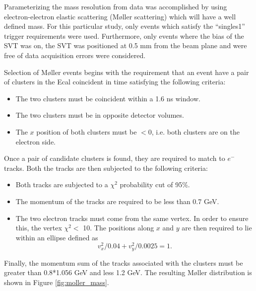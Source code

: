 Parameterizing the mass resolution from data was accomplished by using electron-electron
elastic scattering (M\o ller scattering) which will have a well defined mass.
For this particular study, only events which satisfy the ``singles1'' trigger 
requirements were used.  Furthermore, only events where the bias of the SVT was 
on, the SVT was positioned at 0.5 mm from the beam plane and were free of 
data acquisition errors were considered.

Selection of M\o ller events begins with the requirement that an event have a
pair of clusters in the Ecal coincident in time satisfying the following criteria:
\begin{itemize}
    \item The two clusters must be coincident within a 1.6 ns window.
    \item The two clusters must be in opposite detector volumes.
    \item The $x$ position of both clusters must be $<0$, i.e. both clusters
          are on the electron side.
\end{itemize}
Once a pair of candidate clusters is found, they are required to match to 
$e^-$ tracks.  Both the tracks are then subjected to the following criteria:
\begin{itemize}
    \item Both tracks are subjected to a $\chi^{2}$ probability cut of 95\%.
    \item The momentum of the tracks are required to be less than 0.7 GeV.
    \item The two electron tracks must come from the same vertex.  In order to
          ensure this, the vertex $\chi^2 <$ 10. The positions along $x$ and $y$
          are then required to lie within an ellipse defined as
          \[
                v_x^2/0.04 + v_y^2/0.0025  = 1.
          \]
\end{itemize}
Finally, the momentum sum of the tracks associated with the clusters must be
greater than 0.8*1.056 GeV and less 1.2 GeV.  The resulting M\o ller distribution
is shown in Figure \ref{fig:moller_mass}. 

